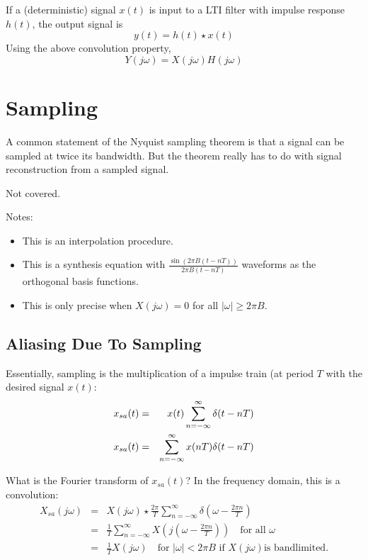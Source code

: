 {If a (deterministic) signal $x(t)$ is input to a LTI filter with
impulse response $h(t)$, the output signal is
\[
  y(t) = h(t) \star x(t)
\]
Using the above convolution property,
\[
  Y(j \omega) = X(j \omega)  H(j \omega)
\]

\section{Sampling}

A common statement of the Nyquist sampling theorem is that a signal
can be sampled at twice its bandwidth.  But the theorem really has
to do with signal reconstruction from a sampled signal.

{Not covered.}

Notes:
\begin{itemize}
\item This is an interpolation procedure.
\item This is a synthesis equation with $\frac{\sin (2\pi B(t-nT))}{2\pi B(t-nT)}$ waveforms as the orthogonal basis functions.
\item This is only precise when $X(j\omega) = 0$ for all $|\omega| \ge 2\pi B$.
\end{itemize}

\subsection{Aliasing Due To Sampling}

Essentially, sampling is the multiplication of a impulse train (at
period $T$ with the desired signal $x(t)$:
\begin{eqnarray} \label{E:SampledViaImpulseTrain}
  x_{sa}(t) &=&  x(t) \sum_{n=-\infty}^\infty \delta(t-nT) \nonumber \\ 
  x_{sa}(t) &=&  \sum_{n=-\infty}^\infty x(nT)  \delta(t-nT) \nonumber
\end{eqnarray}

What is the Fourier transform of $x_{sa}(t)$?  In the frequency domain, this is a convolution:
\begin{eqnarray} \label{E:FT_of_Sampled_Signal_1}
  X_{sa}(j\omega) &=& X(j\omega) \star \frac{2\pi}{T} \sum_{n=-\infty}^\infty \delta\left(\omega- \frac{2\pi n}{T} \right)
    \nonumber \\
  &=& \frac{1}{T}  \sum_{n=-\infty}^\infty X\left(j \left( \omega- \frac{2\pi n}{T}
  \right) \right) \quad \mbox{for all } \omega
    \\
  &=& \frac{1}{T}  X(j\omega) \quad \mbox{for } |\omega| < 2\pi B \mbox{ if } X(j\omega) \mbox{is bandlimited.}
    \nonumber
\end{eqnarray}}

